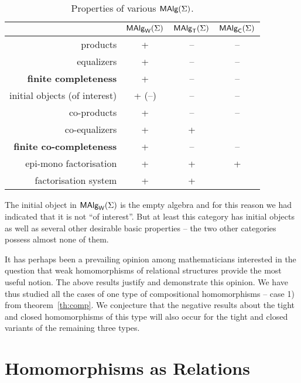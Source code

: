 \documentclass[10pt]{article}
\begin{document}
\begin{table}[htb]
\begin{center}
\begin{tabular}{|r|c|c|c|}
\hline 
                   & $\mbox{\rm\sf MAlg}_{\sf W}(\Sigma)$ & $\mbox{\rm\sf MAlg}_{\sf T}(\Sigma)$ & $\mbox{\rm\sf MAlg}_{\sf C}(\Sigma)$ \\ \hline
products           & +  & -- & -- \\
equalizers         & +  & -- & -- \\
{\bf finite completeness} & +  & -- & --  \\ \hline
initial objects (of interest) & + (--) & -- & -- \\
co-products        & +  & --  &  -- \\
co-equalizers      & +  & +  &  \\
{\bf finite co-completeness} & +  & -- & -- \\ \hline
epi-mono factorisation & +  & +  & + \\ 
factorisation system & + & + &  \\ \hline %
\end{tabular}
\end{center}
\caption{Properties of various $\mbox{\rm\sf MAlg}(\Sigma)$.}\label{tab:A} %
\end{table}

\noindent
The initial object in $\mbox{\rm\sf MAlg}_{\sf W}(\Sigma)$ is the empty algebra and for this reason
we had indicated that it is not ``of interest''. But at least this
category has initial objects as well as several other desirable basic
properties -- the two other categories possess almost none of them.

It has perhaps been a prevailing opinion among mathematicians
interested in the question that weak homomorphisms of relational
structures provide the most useful notion.  The above results justify
and demonstrate this opinion. We have thus studied all the cases of
one type of compositional homomorphisms -- case 1) from
theorem~\ref{th:comp}. We conjecture that the negative results about
the tight and closed homomorphisms of this type will also occur for
the tight and closed variants of the remaining three types.



\section{Homomorphisms as Relations}
\label{se:horel}
\end{document}
